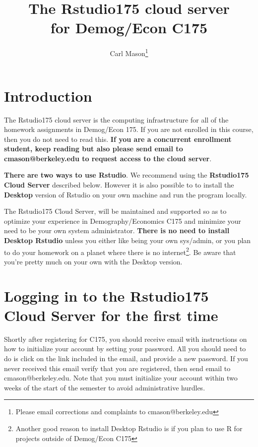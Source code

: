 \documentclass[11pt]{article}
\begin{document}
\title{The Rstudio175 cloud server\\
for Demog/Econ C175}
\author{Carl Mason\footnote{Please email corrections and complaints to cmason@berkeley.edu}}
\maketitle

\tableofcontents

\section{Introduction}

The Rstudio175 cloud server is the computing infrastructure for all of the homework assignments in Demog/Econ 175. If you are not enrolled in this course, then you do not need to read this.  \textbf{If you are a concurrent enrollment student, keep reading but also please send email to cmason@berkeley.edu to request access to the cloud server}.

\begin{minipage}[H]{1.0\linewidth}

\begin{mdframed}[backgroundcolor=blue!20]        
\textbf{There are two ways to use Rstudio}. We recommend using the \textbf{Rstudio175 Cloud Server} described below. However it is also possible to  to install the \textbf{Desktop} version of  Rstudio on your own machine and run the program locally.

The Rstudio175 Cloud Server, will be maintained and supported so as to optimize your experience in Demography/Economics C175 and minimize your need to be your own system administrator.  \textbf{There is no need to install Desktop Rstudio} unless you either like  being your own sys/admin, or you plan to do your homework on a planet where there is no internet\footnote{Another good reason to install Desktop Rstudio is if you plan to use R for projects outside of Demog/Econ C175}. Be aware that you're pretty much on your own with the Desktop version.  
\end{mdframed}
  
\end{minipage}
\section{Logging in to the Rstudio175 Cloud Server for the first time}

Shortly after registering for C175, you should receive email with instructions on how to initialize your account by setting your password.  All you should need to do is click on the link included in the email, and provide a new password.  If you never received this email verify that you are registered, then send email to cmason@berkeley.edu.  Note that you must initialize your account within two weeks of the start of the semester to avoid administrative hurdles.
\end{document}
